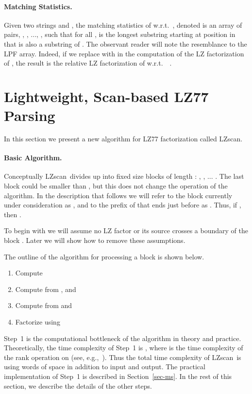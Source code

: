 \documentclass[runningheads]{llncs}
\def\LZSCAN{\mbox{\sf LZscan}}
\begin{document}
{\paragraph{Matching Statistics.}
Given two strings  and , the matching statistics of 
w.r.t.~, denoted  is an array of  pairs,
, , ..., ,
such that for all ,  is the longest substring starting at position 
in  that is also a substring of . The observant reader will
note the resemblance to the LPF array. Indeed, if we replace
 with  in the computation of the LZ factorization
of , the result is the relative LZ factorization of 
w.r.t.~~\cite{RLZspire2010}.

\section{Lightweight, Scan-based LZ77 Parsing}
\label{sec-algorithm}

In this section we present a new algorithm for LZ77 factorization
called \LZSCAN.

\paragraph{Basic Algorithm.}

Conceptually \LZSCAN\ divides  up into  fixed size
blocks of length : , , ... . The last
block could be smaller than , but this does not change the
operation of the algorithm.  In the description that follows we will
refer to the block currently under consideration as , and to the
prefix of  that ends just before  as . Thus, if , then .  

To begin with we will assume no LZ factor or its source
crosses a boundary of the block . Later we will show how to remove
these assumptions.

The outline of the algorithm for processing a block  is shown below.
\begin{enumerate}
\item Compute 
\item Compute  from ,  and 
\item Compute  from  and
  
\item Factorize  using 
\end{enumerate}
Step~1 is the computational bottleneck of the algorithm in theory and
practice. Theoretically, the time complexity of Step~1 is
, where  is the time complexity of
the rank operation on  (see, e.g.,~\cite{bgnn2010}). 
Thus the total time complexity of
\LZSCAN\ is  using  words of space in
addition to input and output. 
The practical implementation of Step~1 is described
in
Section~\ref{sec-ms}. In the rest of this section,
we describe the details of the other steps.

}
\end{document}
